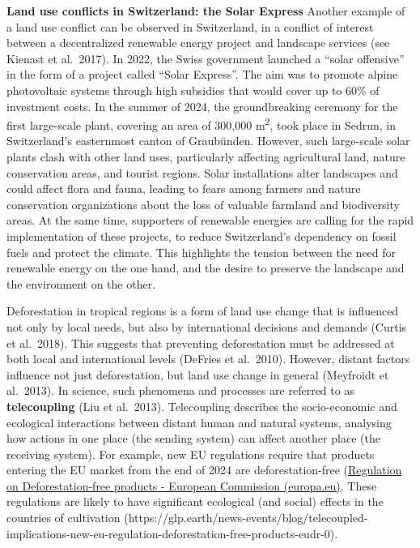 \documentclass[
  a4paper,
  openany]{book}
\begin{document}
\begin{tcolorbox}[enhanced jigsaw, left=2mm, arc=.35mm, titlerule=0mm, opacityback=0, leftrule=.75mm, title={Tip}, breakable, bottomtitle=1mm, rightrule=.15mm, coltitle=black, toptitle=1mm, bottomrule=.15mm, colback=white, opacitybacktitle=0.6, colbacktitle=quarto-callout-tip-color!10!white, toprule=.15mm, colframe=quarto-callout-tip-color-frame]

\textbf{Land use conflicts in Switzerland: the Solar Express} Another
example of a land use conflict can be observed in Switzerland, in a
conflict of interest between a decentralized renewable energy project
and landscape services (see Kienast et al.~2017). In 2022, the Swiss
government launched a ``solar offensive'' in the form of a project
called ``Solar Express''. The aim was to promote alpine photovoltaic
systems through high subsidies that would cover up to 60\% of investment
costs. In the summer of 2024, the groundbreaking ceremony for the first
large-scale plant, covering an area of 300,000 m\textsuperscript{2},
took place in Sedrun, in Switzerland's easternmost canton of Graubünden.
However, such large-scale solar plants clash with other land uses,
particularly affecting agricultural land, nature conservation areas, and
tourist regions. Solar installations alter landscapes and could affect
flora and fauna, leading to fears among farmers and nature conservation
organizations about the loss of valuable farmland and biodiversity
areas. At the same time, supporters of renewable energies are calling
for the rapid implementation of these projects, to reduce Switzerland's
dependency on fossil fuels and protect the climate. This highlights the
tension between the need for renewable energy on the one hand, and the
desire to preserve the landscape and the environment on the other.

\end{tcolorbox}

Deforestation in tropical regions is a form of land use change that is
influenced not only by local needs, but also by international decisions
and demands (Curtis et al.~2018). This suggests that preventing
deforestation must be addressed at both local and international levels
(DeFries et al.~2010). However, distant factors influence not just
deforestation, but land use change in general (Meyfroidt et al.~2013).
In science, such phenomena and processes are referred to as
\textbf{telecoupling} (Liu et al.~2013). Telecoupling describes the
socio-economic and ecological interactions between distant human and
natural systems, analysing how actions in one place (the sending system)
can affect another place (the receiving system). For example, new EU
regulations require that products entering the EU market from the end of
2024 are deforestation-free
(\href{https://environment.ec.europa.eu/topics/forests/deforestation/regulation-deforestation-free-products_en}{Regulation
on Deforestation-free products - European Commission (europa.eu)}. These
regulations are likely to have significant ecological (and social)
effects in the countries of cultivation
(https://glp.earth/news-events/blog/telecoupled-implications-new-eu-regulation-deforestation-free-products-eudr-0).
\end{document}
